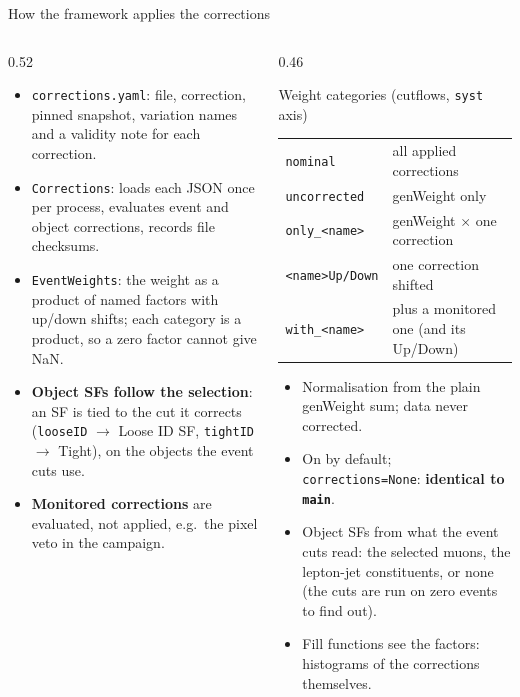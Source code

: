 \documentclass[aspectratio=169,11pt]{beamer}
\newcommand{\code}[1]{{\small\colorbox{codebg}{\texttt{#1}}}}
\begin{document}
\begin{frame}{How the framework applies the corrections}
  \begin{columns}[T]
    \begin{column}{0.52\textwidth}
      \scriptsize
      \begin{itemize}
        \item \code{corrections.yaml}: file, correction, pinned snapshot, variation names and
              a validity note for each correction.
        \item \code{Corrections}: loads each JSON once per process, evaluates event and object
              corrections, records file checksums.
        \item \code{EventWeights}: the weight as a product of named factors with up/down shifts;
              each category is a product, so a zero factor cannot give NaN.
        \item \textbf{Object SFs follow the selection}: an SF is tied to the cut it corrects
              (\code{looseID} $\to$ Loose ID SF, \code{tightID} $\to$ Tight), on the objects the
              event cuts use.
        \item \textbf{Monitored corrections} are evaluated, not applied, e.g.\ the pixel veto
              in the campaign.
      \end{itemize}
    \end{column}
    \begin{column}{0.46\textwidth}
      {\scriptsize
      \begin{block}{Weight categories (cutflows, \texttt{syst} axis)}
        \begin{tabular}{@{}p{2.3cm}p{3.4cm}@{}}
          \texttt{nominal} & all applied corrections \\
          \texttt{uncorrected} & genWeight only \\
          \texttt{only\_<name>} & genWeight $\times$ one correction \\
          \texttt{<name>Up/Down} & one correction shifted \\
          \texttt{with\_<name>} & plus a monitored one (and its Up/Down) \\
        \end{tabular}
      \end{block}}
      {\scriptsize
      \begin{itemize}
        \item Normalisation from the plain genWeight sum; data never corrected.
        \item On by default; \code{corrections=None}: \textbf{identical to \texttt{main}}.
        \item Object SFs from what the event cuts read: the selected muons, the lepton-jet
              constituents, or none (the cuts are run on zero events to find out).
        \item Fill functions see the factors: histograms of the corrections themselves.
      \end{itemize}}
    \end{column}
  \end{columns}
\end{frame}
\end{document}
